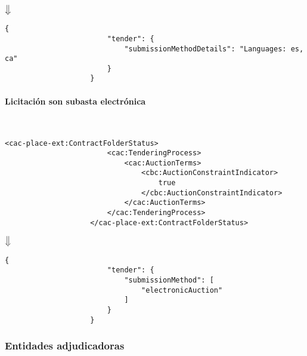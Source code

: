                 \begin{center}
                    $\big\Downarrow$
                \end{center}
                
                \begin{lstlisting}[language=lJSON]
                    {
                        "tender": {
                            "submissionMethodDetails": "Languages: es, ca"
                        }
                    }
                \end{lstlisting}
                
            \paragraph{Licitación son subasta electrónica} \mbox{}\\
                \begin{lstlisting}[language=lXML]
                    <cac-place-ext:ContractFolderStatus>
                        <cac:TenderingProcess>
                            <cac:AuctionTerms>
                                <cbc:AuctionConstraintIndicator>
                                    true
                                </cbc:AuctionConstraintIndicator>
                            </cac:AuctionTerms>
                        </cac:TenderingProcess>
                    </cac-place-ext:ContractFolderStatus>
                \end{lstlisting}
                
                \begin{center}
                    $\big\Downarrow$
                \end{center}
                
                \begin{lstlisting}[language=lJSON]
                    {
                        "tender": {
                            "submissionMethod": [
                                "electronicAuction"
                            ]
                        }
                    }
                \end{lstlisting}
        
        \subsubsection{Entidades adjudicadoras}
